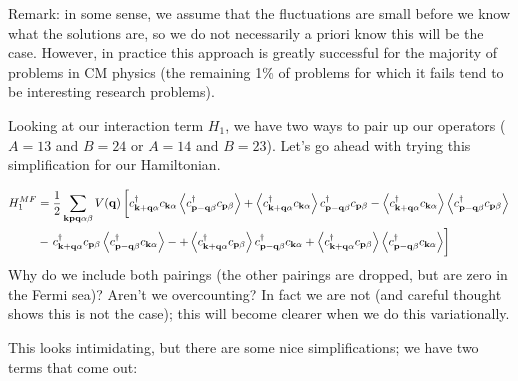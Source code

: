 Remark: in some sense, we assume that the fluctuations are small before we know what the solutions are, so we do not necessarily a priori know this will be the case. However, in practice this approach is greatly successful for the majority of problems in CM physics (the remaining 1\% of problems for which it fails tend to be interesting research problems).

Looking at our interaction term $H_1$, we have two ways to pair up our operators ($A = 13$ and $B = 24$ or $A = 14$ and $B = 23$). Let's go ahead with trying this simplification for our Hamiltonian.

\begin{equation}
    \begin{split}
        H_1^{MF} &= \frac{1}{2}\sum_{\mathbf{kpq}\alpha\beta}V(\mathbf{q})\left[c^\dagger_{\mathbf{k} + \mathbf{q}\alpha}c_{\mathbf{k}\alpha}\left< c^\dagger_{\mathbf{p} - \mathbf{q}\beta} c_{\mathbf{p}\beta} \right> + \left< c^\dagger_{\mathbf{k} + \mathbf{q}\alpha}c_{\mathbf{k}\alpha} \right>c^\dagger_{\mathbf{p} - \mathbf{q}\beta} c_{\mathbf{p}\beta} - \left< c^\dagger_{\mathbf{k} + \mathbf{q}\alpha}c_{\mathbf{k}\alpha} \right>\left< c^\dagger_{\mathbf{p} - \mathbf{q}\beta} c_{\mathbf{p}\beta} \right>\right.
        \\ &- \left.c^\dagger_{\mathbf{k} + \mathbf{q}\alpha}c_{\mathbf{p}\beta}\left< c^{\dagger}_{\mathbf{p} - \mathbf{q}\beta}c_{\mathbf{k}\alpha} \right> - + \left< c^\dagger_{\mathbf{k} + \mathbf{q}\alpha}c_{\mathbf{p}\beta} \right>c^{\dagger}_{\mathbf{p} - \mathbf{q}\beta}c_{\mathbf{k}\alpha} + \left< c^\dagger_{\mathbf{k} + \mathbf{q}\alpha}c_{\mathbf{p}\beta} \right>\left< c^{\dagger}_{\mathbf{p} - \mathbf{q}\beta}c_{\mathbf{k}\alpha} \right>\right]
    \end{split}
\end{equation}
Why do we include both pairings (the other pairings are dropped, but are zero in the Fermi sea)? Aren't we overcounting? In fact we are not (and careful thought shows this is not the case); this will become clearer when we do this variationally.

This looks intimidating, but there are some nice simplifications; we have two terms that come out:


